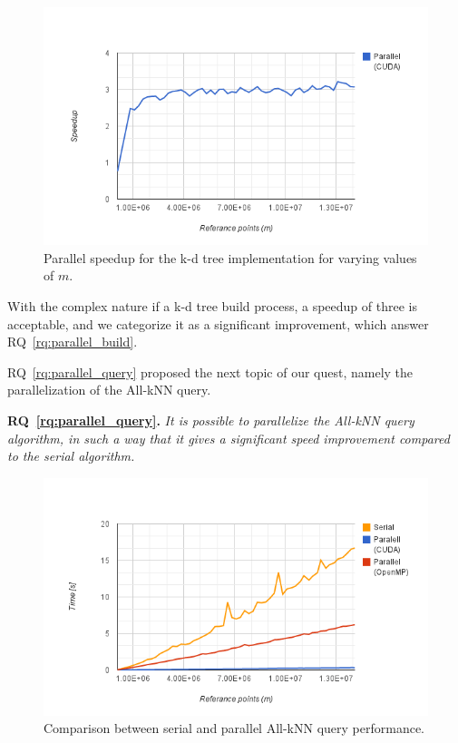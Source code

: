 \begin{figure}[ht!]
    \centering
    \includegraphics[width=120mm]{../gfx/final_tree_build_speedup.png}
    \caption{Parallel speedup for the k-d tree implementation for varying values of $m$.}
    \label{fig:final_tree_build_speedup}
\end{figure}

With the complex nature if a k-d tree build process, a speedup of three is acceptable, and we categorize it as a significant improvement, which answer RQ~\ref{rq:parallel_build}. 


RQ~\ref{rq:parallel_query} proposed the next topic of our quest, namely the parallelization of the All-kNN query. 

\textbf{RQ~\ref{rq:parallel_query}.} \emph{It is possible to parallelize the All-kNN query algorithm, in such a way that it gives a significant speed improvement compared to the serial algorithm.}

\begin{figure}[ht!]
    \centering
    \includegraphics[width=120mm]{../gfx/final_kd_search.png}
    \caption{Comparison between serial and parallel All-kNN query performance.}
    \label{fig:final_kd_search}
\end{figure}

